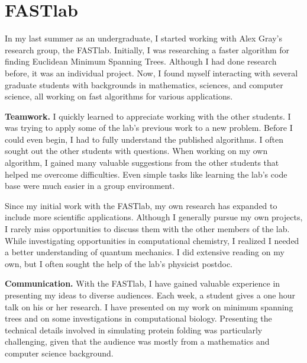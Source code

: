 \documentclass[twoside,leqno, 12pt]{article}
\begin{document}
\section{FASTlab}

In my last summer as an undergraduate, I started working with Alex Gray's research group, the FASTlab.  Initially, I was researching a faster algorithm for finding Euclidean Minimum Spanning Trees.  Although I had done research before, it was an individual project.  Now, I found myself interacting with several graduate students with backgrounds in mathematics, sciences, and computer science, all working on fast algorithms for various applications.  


\textbf{Teamwork.}  I quickly learned to appreciate working with the other students.  I was trying to apply some of the lab's previous work to a new problem.  Before I could even begin, I had to fully understand the published algorithms.  I often sought out the other students with questions.  When working on my own algorithm, I gained many valuable suggestions from the other students that helped me overcome difficulties.  Even simple tasks like learning the lab's code base were much easier in a group environment.  

Since my initial work with the FASTlab, my own research has expanded to include more scientific applications.  Although I generally pursue my own projects, I rarely miss opportunities to discuss them with the other members of the lab.  While investigating opportunities in computational chemistry, I realized I needed a better understanding of quantum mechanics.  I did extensive reading on my own, but I often sought the help of the lab's physicist postdoc.  


\textbf{Communication.}  With the FASTlab, I have gained valuable experience in presenting my ideas to 
diverse audiences.  Each week, a student gives a one hour talk on his or her research.  I have presented on my work on minimum spanning trees and on some investigations in computational biology.  Presenting the technical details involved in simulating protein folding was particularly challenging, given that the audience was mostly from a mathematics and computer science background.  
\end{document}
